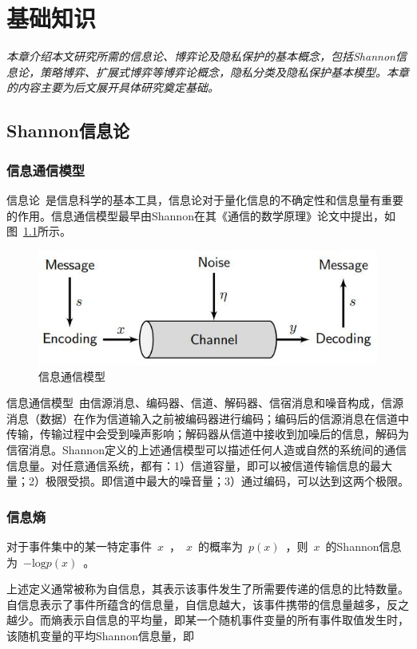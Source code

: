\chapter{基础知识}
\label{chap:preliminary}

\textit{}

\textit{本章介绍本文研究所需的信息论、博弈论及隐私保护的基本概念，包括Shannon信息论，策略博弈、扩展式博弈等博弈论概念，隐私分类及隐私保护基本模型。本章的内容主要为后文展开具体研究奠定基础。}
\section{Shannon信息论}

\subsection{信息通信模型}
信息论~\cite{shannon1948mathematical,
	stone2018information}是信息科学的基本工具，信息论对于量化信息的不确定性和信息量有重要的作用。信息通信模型最早由Shannon在其《通信的数学原理》论文中提出，如图~\ref{fig:communication-model}所示。

\begin{figure}[htbp]
	\centering
	\includegraphics[width = 0.55\linewidth]{./figures/shannon-communicaiton-model.jpg}
	\caption{信息通信模型~\cite{stone2018information}
	}
	\label{fig:communication-model}
\end{figure}

信息通信模型~\cite{stone2018information}由信源消息、编码器、信道、解码器、信宿消息和噪音构成，信源消息（数据）在作为信道输入之前被编码器进行编码；编码后的信源消息在信道中传输，传输过程中会受到噪声影响；解码器从信道中接收到加噪后的信息，解码为信宿消息。Shannon定义的上述通信模型可以描述任何人造或自然的系统间的通信信息量。对任意通信系统，都有：1）信道容量，即可以被信道传输信息的最大量；2）极限受损。即信道中最大的噪音量；3）通过编码，可以达到这两个极限。



\subsection{信息熵}


\begin{definition}
	对于事件集中的某一特定事件~$x$~，~$x$~的概率为~$p(x)$~，则~$x$~的Shannon信息为~$-\text{log}p(x)$~。
\end{definition}
上述定义通常被称为自信息，其表示该事件发生了所需要传递的信息的比特数量。自信息表示了事件所蕴含的信息量，自信息越大，该事件携带的信息量越多，反之越少。而熵表示自信息的平均量，即某一个随机事件变量的所有事件取值发生时，该随机变量的平均Shannon信息量，即

